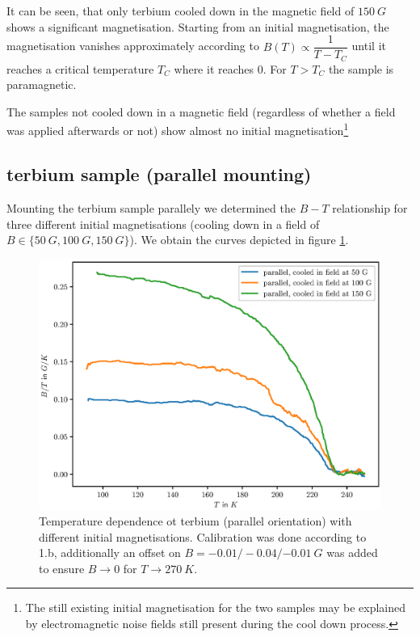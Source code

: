 \documentclass[paper=a4, fontsize=10pt]{scrartcl}
\begin{document}
It can be seen, that only terbium cooled down in the magnetic field of
$\SI{150}{G}$ shows a significant magnetisation. Starting from an
initial magnetisation, the magnetisation vanishes approximately
according to $B(T) \propto \dfrac{1}{T-T_C}$ until it reaches a critical
temperature $T_{C}$ where it reaches 0. For $T>T_C$ the sample is
paramagnetic.

The samples not cooled down in a magnetic field (regardless of whether
a field was applied afterwards or not) show almost no initial
magnetisation\footnote{The still existing initial magnetisation for
  the two samples may be explained by electromagnetic noise fields
  still present during the cool down process.}




\subsection{terbium sample (parallel mounting)}

Mounting the terbium sample parallely we determined the $B-T$
relationship for three different initial magnetisations (cooling down
in a field of $B \in \{ \SI{50}{G}, \SI{100}{G}, \SI{150}{G}\}$). We
obtain the curves depicted in figure \ref{fig:terbium_parallel}.


\begin{figure}
  \centering
  \includegraphics{plots/2_b_parallel}
  \caption{Temperature dependence ot terbium (parallel orientation)
    with different initial magnetisations. Calibration was done
    according to 1.b, additionally an offset on
    $B = -0.01/ -0.04/ \SI{-0.01}{G}$ was added to ensure
    $B \rightarrow 0$ for $T \rightarrow \SI{270}{K}$.}
  \label{fig:terbium_parallel}
\end{figure}
\end{document}
